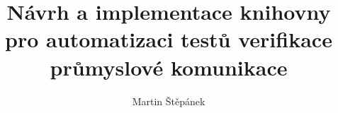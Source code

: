 \documentclass[thesis=B,czech]{template/FITthesis}[2019/12/23]
\title{Návrh a implementace knihovny pro automatizaci testů verifikace průmyslové komunikace}
\author{Martin Štěpánek} %
\begin{document}


{
    \setlength{\emergencystretch}{3em} 
    \def\UrlBreaks{\do\/\do\-\do\_}
    \printbibliography
}

\appendix


\end{document}

